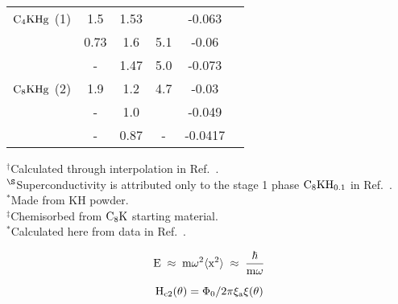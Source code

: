 {\begin{table}
\begin{center}
\begin{tabular}{|lc|cccc|}
$\rm C_4KHg$ (1) & 1.5\cite{W179} & 1.53\cite{W179} &  & -0.063\cite{W179}\\ 
& 0.73\cite{tanuma81} & 1.6\cite{yang88} & 5.1\cite{yang88} & -0.06\cite{yang88}\\ 
&-& 1.47\cite{preil84} & 5.0\cite{fischer85} & -0.073\cite{conard81}\\ 
$\rm C_8KHg$ (2) & 1.9\cite{pendrys81} & 1.2 & 4.7\cite{yang88} & -0.03\cite{yang88} \\ 
&-& 1.0\cite{W179}  &  & -0.049\cite{W179} \\ 
&-& 0.87\cite{preil84} &-& -0.0417\cite{preil84}\\ 
\hline
\end{tabular}
\end{center}
$^{\dagger}$Calculated through interpolation in Ref.~\cite{enoki85}.\\ 
$^{\S}$Superconductivity is attributed only to the stage 1  phase $\rm
C_8KH_{0.1}$ in Ref.~\cite{enoki85}.\\ 
$^{\ast}$Made from KH powder.\\ 
$^{\ddag}$Chemisorbed from $\rm C_8K$ starting material.\\ 
$^*$Calculated here from data in Ref.~\cite{E291}.
\end{table}
}

{\newpage
\clearpage
\samepage \begin{table}[p]

\label{resistanis}
\end{table}
}

\setcounter{chapter}{6}
{\newpage
\clearpage
\samepage \begin{figure}\vspace{15cm}

\label{softmode}
\end{figure}
}

\appendix
{}
{\newpage
\clearpage
\samepage \begin{displaymath}\rm E \; \approx \; m \omega^2 \langle x^2 \rangle  \; \approx \; \frac{\hbar}{m \omega}
\end{displaymath}
}

{\newpage
\clearpage
\samepage \begin{equation}%
\rm H_{c2}(\theta) =  \Phi_0/2 \pi  \xi_a  \xi(\theta)
\label{xitheta}
\end{equation}
}


